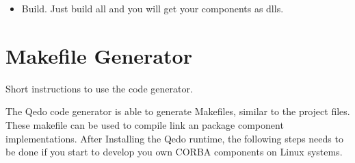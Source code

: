 \documentclass[12pt,a4paper]{report}
\begin{document}
\begin{itemize}
	\item Build. Just build all and you will get your components as dlls.

\end{itemize}

\section{Makefile Generator}
\label{sec:MakefileGenerator}

Short instructions to use the code generator.

The Qedo code generator is able to generate Makefiles, similar to the project files. These makefile can be used to compile link an package component implementations.
After Installing the Qedo runtime, the following steps needs to be done if you start to develop you own CORBA components on Linux systems.
\end{document}
